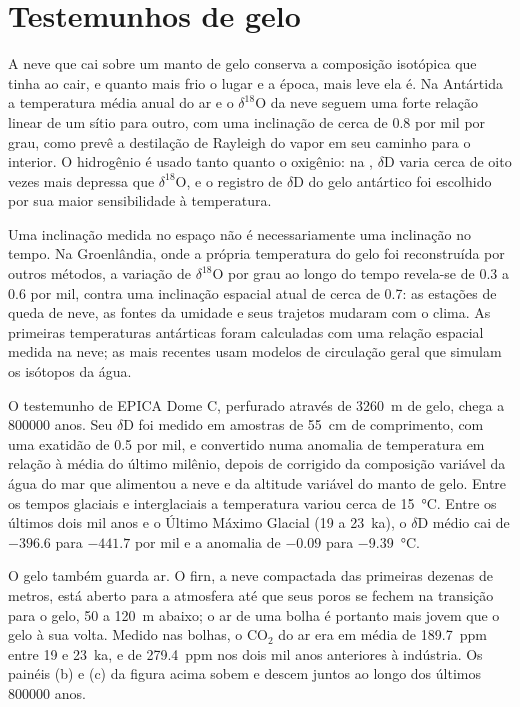 \section{Testemunhos de gelo}\label{sec:b2:climate-proxies:ice}

A neve que cai sobre um manto de gelo conserva a composição isotópica que tinha ao cair, e quanto
mais frio o lugar e a época, mais leve ela é. Na Antártida a temperatura média anual do ar e
o $\delta^{18}$O da neve seguem uma forte relação linear de um sítio para outro, com uma
inclinação de cerca de \num{0.8} por mil por grau, como prevê a destilação de Rayleigh do vapor em seu caminho
para o interior. O hidrogênio é usado tanto quanto o oxigênio: na , $\delta$D varia cerca de oito vezes mais depressa que $\delta^{18}$O, e
o registro de $\delta$D do gelo antártico foi escolhido por sua maior sensibilidade à temperatura.

Uma inclinação medida no espaço não é necessariamente uma inclinação no tempo. Na Groenlândia, onde a própria
temperatura do gelo foi reconstruída por outros métodos, a variação de $\delta^{18}$O por grau
ao longo do tempo revela-se de 0.3 a \num{0.6} por mil, contra uma inclinação espacial atual de cerca de
\num{0.7}: as estações de queda de neve, as fontes da umidade e seus trajetos mudaram com o
clima. As primeiras temperaturas antárticas foram calculadas com uma relação espacial medida na
neve; as mais recentes usam modelos de circulação geral que simulam os isótopos da água.

O testemunho de EPICA Dome C, perfurado através de \qty{3260}{m} de gelo, chega a \num{800000} anos. Seu
$\delta$D foi medido em amostras de \qty{55}{cm} de comprimento, com uma exatidão de \num{0.5} por mil, e
convertido numa anomalia de temperatura em relação à média do último milênio, depois de
corrigido da composição variável da água do mar que alimentou a neve e da altitude variável
do manto de gelo. Entre os tempos glaciais e interglaciais a temperatura variou cerca de
\qty{15}{\celsius}. Entre os últimos dois mil anos e o Último Máximo Glacial (\num{19} a
\qty{23}{ka}), o $\delta$D médio cai de $-396.6$ para $-441.7$ por mil e a anomalia de
$-0.09$ para \qty{-9.39}{\celsius}.

O gelo também guarda ar. O firn, a neve compactada das primeiras dezenas de metros, está aberto para a
atmosfera até que seus poros se fechem na transição para o gelo, 50 a \qty{120}{m} abaixo; o ar
de uma bolha é portanto mais jovem que o gelo à sua volta. Medido nas bolhas, o CO$_2$ do
ar era em média de \qty{189.7}{ppm} entre \num{19} e \qty{23}{ka}, e de \qty{279.4}{ppm} nos
dois mil anos anteriores à indústria. Os painéis (b) e (c) da figura acima sobem e descem
juntos ao longo dos últimos \num{800000} anos.

